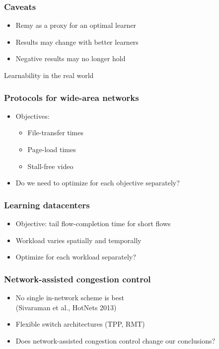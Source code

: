 \documentclass[svgnames]{beamer}
\begin{document}
\begin{Large}






 



\begin{frame}
\frametitle{Caveats}
\begin{itemize}
\item<2-> Remy as a proxy for an optimal learner
\item<3-> Results may change with better learners
\item<4-> Negative results may no longer hold
\end{itemize}
\end{frame}

\begin{frame}
\begin{center}
Learnability in the real world
\end{center}
\end{frame}

\begin{frame}
\frametitle{Protocols for wide-area networks}
\begin{itemize}
\item<1-> Objectives:
\begin{itemize}
\item File-transfer times
\item Page-load times
\item Stall-free video
\end{itemize}
\item<2-> Do we need to optimize for each objective separately?
\end{itemize}
\end{frame}

\begin{frame}
\frametitle{Learning datacenters}
\begin{itemize}
\item<1-> Objective: tail flow-completion time for short flows
\item<2-> Workload varies spatially and temporally
\item<3-> Optimize for each workload separately?
\end{itemize}
\end{frame}

\begin{frame}
\frametitle{Network-assisted congestion control}
\begin{itemize}
\item<1-> No single in-network scheme is best\\
          (Sivaraman et al., HotNets 2013)
\item<2-> Flexible switch architectures (TPP, RMT)
\item<3-> Does network-assisted congestion control change our conclusions?
\end{itemize}
\end{frame}


\end{Large}
\end{document}
